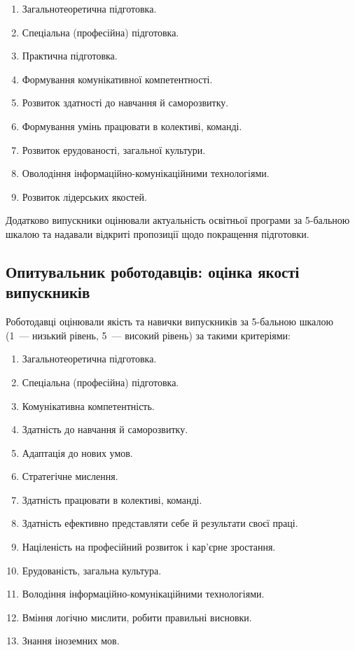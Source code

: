 \begin{enumerate}
    \item Загальнотеоретична підготовка.
    \item Спеціальна (професійна) підготовка.
    \item Практична підготовка.
    \item Формування комунікативної компетентності.
    \item Розвиток здатності до навчання й саморозвитку.
    \item Формування умінь працювати в колективі, команді.
    \item Розвиток ерудованості, загальної культури.
    \item Оволодіння інформаційно-комунікаційними технологіями.
    \item Розвиток лідерських якостей.
\end{enumerate}

Додатково випускники оцінювали актуальність освітньої програми за 5-бальною шкалою та надавали відкриті пропозиції щодо покращення підготовки.

\subsection{Опитувальник роботодавців: оцінка якості випускників}

Роботодавці оцінювали якість та навички випускників за 5-бальною шкалою (1~--- низький рівень, 5~--- високий рівень) за такими критеріями:

\begin{enumerate}
    \item Загальнотеоретична підготовка.
    \item Спеціальна (професійна) підготовка.
    \item Комунікативна компетентність.
    \item Здатність до навчання й саморозвитку.
    \item Адаптація до нових умов.
    \item Стратегічне мислення.
    \item Здатність працювати в колективі, команді.
    \item Здатність ефективно представляти себе й результати своєї праці.
    \item Націленість на професійний розвиток і кар'єрне зростання.
    \item Ерудованість, загальна культура.
    \item Володіння інформаційно-комунікаційними технологіями.
    \item Вміння логічно мислити, робити правильні висновки.
    \item Знання іноземних мов.
\end{enumerate}

